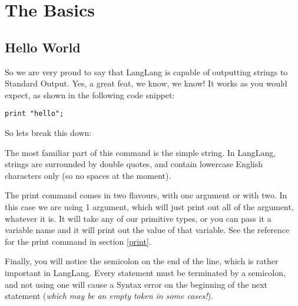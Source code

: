 \section{The Basics}
\subsection{Hello World}
\label{helloworld}
\begin{normalsize}
So we are very proud to say that LangLang is capable of outputting strings to Standard Output. Yes, a great feat, we know, we know! It works as you would expect, as shown in the following code snippet:

\begin{center}
\begin{minipage}{8cm}
\begin{verbatim}
print "hello";
\end{verbatim}
\end{minipage}
\end{center}

So lets break this down:

The most familiar part of this command is the simple string. In LangLang, strings are surrounded by double quotes, and contain lowercase English characters only (so no spaces at the moment).

The print command comes in two flavours, with one argument or with two. In this case we are using 1 argument, which will just print out all of the argument, whatever it is. It will take any of our primitive types, or you can pass it a variable name and it will print out the value of that variable. See the reference for the print command in section \ref{print}.

Finally, you will notice the semicolon on the end of the line, which is rather important in LangLang. Every statement must be terminated by a semicolon, and not using one will cause a Syntax error on the beginning of the next statement (\textit{which may be an empty token in some cases!}).
\end{normalsize}

